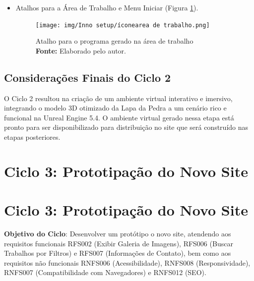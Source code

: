 \begin{itemize}
    \item Atalhos para a Área de Trabalho e Menu Iniciar (Figura \ref{fig:atalho_icone}). 
    \begin{figure}[H]
        \centering
        \texttt{[image: img/Inno setup/íconearea de trabalho.png]}
        \caption{Atalho para o programa gerado na área de trabalho \\
            \textbf{Fonte:} Elaborado pelo autor.}
        \label{fig:atalho_icone}
\end{figure}
    
\end{itemize}




\subsection{Considerações Finais do Ciclo 2}
O Ciclo 2 resultou na criação de um ambiente virtual interativo e imersivo, integrando o modelo 3D otimizado da Lapa da Pedra a um cenário rico e funcional na Unreal Engine 5.4. O ambiente virtual gerado nessa etapa está pronto para ser disponibilizado para distribuição no site que será construído nas etapas posteriores.



\section{Ciclo 3: Prototipação do Novo Site}
\label{sec:ciclo3_prototipacao}



\section{Ciclo 3: Prototipação do Novo Site}
\label{sec:ciclo3_site}

\textbf{Objetivo do Ciclo}: Desenvolver um protótipo o novo site, atendendo aos requisitos funcionais RFS002 (Exibir Galeria de Imagens), RFS006 (Buscar Trabalhos por Filtros) e RFS007 (Informações de Contato), bem como aos requisitos não funcionais RNFS006 (Acessibilidade), RNFS008 (Responsividade), RNFS007 (Compatibilidade com Navegadores) e RNFS012 (SEO).

